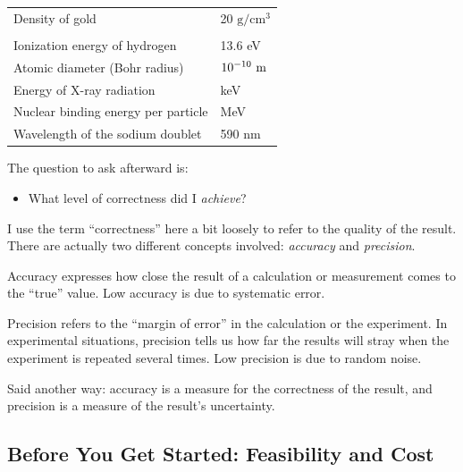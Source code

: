 \begin{table}[t!]
{\begin{tabular}{lp{}}
Density of gold                         & 20$\text{ g}/\text{cm}^3$ \\
                                        & \\[-6pt]
Ionization energy of hydrogen           & 13.6 eV \\
Atomic diameter (Bohr radius)           & $\hbox{10}^{-\hbox{\scriptsize 10}}\text{ m}$ \\
Energy of X-ray radiation               & keV \\
Nuclear binding energy per particle     & MeV \\
Wavelength of the sodium doublet                          & 590 nm \\
\end{tabular}}
\end{table}

\clearpage
   
The question to ask afterward is:
\begin{itemize}
\item What level of correctness did I \emph{achieve}?
\end{itemize}

I use the term ``correctness'' here a bit loosely to refer to the
quality of the result. There are actually two different concepts
involved: \emph{accuracy} and \emph{precision}.
\begin{unnumlist}
\item {} Accuracy expresses how close the result of a calculation
  or measurement comes to the ``true'' value. Low accuracy is due to
  systematic error.
  
\item Precision refers to the ``margin of error''  in the 
  calculation or the experiment. In experimental situations, precision
  tells us how far the results will stray when the experiment is 
  repeated several times. Low precision is due to random noise.
\end{unnumlist}

Said another way: accuracy is a measure for the correctness of the
result, and precision is a measure of the result's uncertainty.

\vspace*{-12pt}
\subsection{Before You Get Started: Feasibility and Cost}
     

